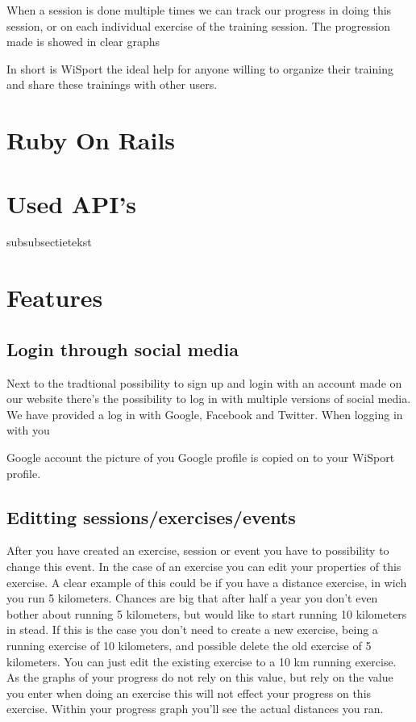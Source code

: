 \documentclass[11pt,a4paper]{scrartcl}
\begin{document}
When a session is done multiple times we can track our progress in doing this session, or on each individual exercise of the training session. The progression made is 
showed in clear graphs

In short is WiSport the ideal help for anyone willing to organize their training and share these trainings with other users.

\section{Ruby On Rails}

\section{Used API's}
subsubsectietekst
\section{Features}
\subsection{Login through social media}
Next to the tradtional possibility to sign up and login with an account made on our
website there's the possibility to log in with multiple versions of social media. We
have provided a log in with Google, Facebook and Twitter. When logging in with you

Google account the picture of you Google profile is copied on to your WiSport profile.

\subsection{Editting sessions/exercises/events}
After you have created an exercise, session or event you have to possibility to change
this event. In the case of an exercise you can edit your properties of this exercise.
A clear example of this could be if you have a distance exercise, in wich you run 5
kilometers. Chances are big that after half a year you don't even bother about running
5 kilometers, but would like to start running 10 kilometers in stead. If this is the case
you don't need to create a new exercise, being a running exercise of 10 kilometers, and
possible delete the old exercise of 5 kilometers. You can just edit the existing exercise
to a 10 km running exercise. As the graphs of your progress do not rely on this value,
but rely on the value you enter when doing an exercise this will not effect your progress
on this exercise. Within your progress graph you'll see the actual distances you ran.
\end{document}
